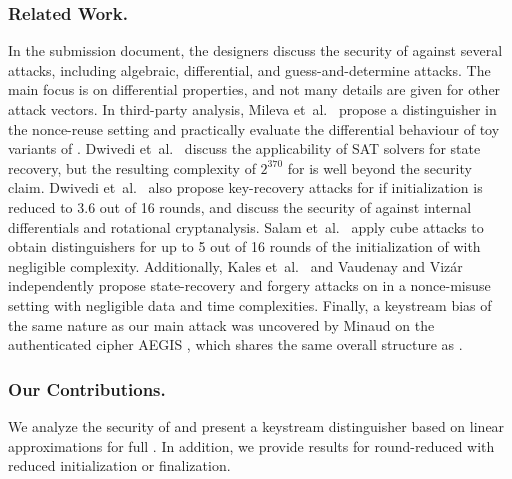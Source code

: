 \subsubsection*{Related Work.}
In the \morus submission document, the designers discuss the security of \morus against
several attacks, including algebraic, differential, and guess-and-determine attacks.
The main focus is on differential properties, and not many details are given for other attack vectors.
In third-party analysis,
Mileva et~al.~\cite{balkancryptsecMilevaDV15} propose a distinguisher in the nonce-reuse setting and practically evaluate the differential behaviour of toy variants of \morus.
Dwivedi et~al.~\cite{cryptoeprint:2016:1053} discuss the applicability of SAT solvers for state recovery, but the resulting complexity of $2^{370}$ for \morus[640] is well beyond the security claim.
Dwivedi et~al.~\cite{secryptDwivediMW17} also propose key-recovery attacks for \morus[1280] if initialization is reduced to 3.6 out of 16 rounds, and discuss the security of \morus against internal differentials and rotational cryptanalysis.
Salam et~al.~\cite{trustcomSalamSBDPW17} apply cube attacks to obtain distinguishers for up to 5 out of 16 rounds of the initialization of \morus[1280] with negligible complexity.
Additionally, 
Kales et~al.~\cite{cryptoeprint:2017:1137} and
Vaudenay and Viz\'{a}r \cite{cryptoeprint:2017:1147}
independently propose state-recovery and forgery attacks on \morus in a nonce-misuse setting with negligible data and time complexities.
Finally, a keystream bias of the same nature as our main attack was uncovered by Minaud \cite{sacryptMinaud14} on the authenticated cipher AEGIS \cite{AEGIS}, which shares the same overall structure as \morus.

\subsubsection*{Our Contributions.}
We analyze the security of \morus and present a keystream distinguisher based on
linear approximations for full \morus[1280].
In addition, we provide results for round-reduced \morus with reduced initialization or finalization.

